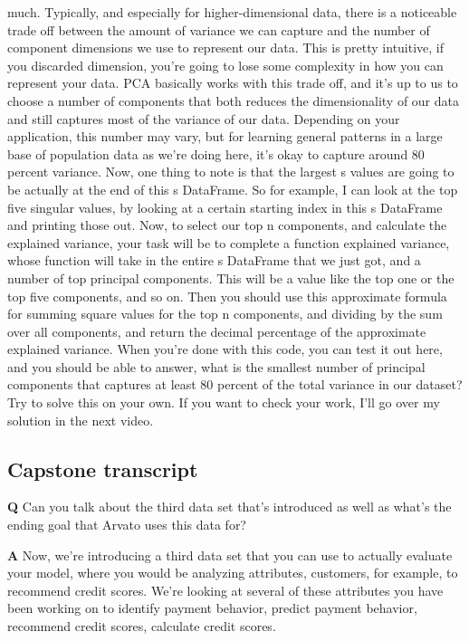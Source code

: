 much. Typically, and especially for higher-dimensional data, there is a
noticeable trade off between the amount of variance we can capture and
the number of component dimensions we use to represent our data. This is
pretty intuitive, if you discarded dimension, you're going to lose some
complexity in how you can represent your data. PCA basically works with
this trade off, and it's up to us to choose a number of components that
both reduces the dimensionality of our data and still captures most of
the variance of our data. Depending on your application, this number may
vary, but for learning general patterns in a large base of population
data as we're doing here, it's okay to capture around 80 percent
variance. Now, one thing to note is that the largest s values are going
to be actually at the end of this s DataFrame. So for example, I can
look at the top five singular values, by looking at a certain starting
index in this s DataFrame and printing those out. Now, to select our top
n components, and calculate the explained variance, your task will be to
complete a function explained variance, whose function will take in the
entire s DataFrame that we just got, and a number of top principal
components. This will be a value like the top one or the top five
components, and so on. Then you should use this approximate formula for
summing square values for the top n components, and dividing by the sum
over all components, and return the decimal percentage of the
approximate explained variance. When you're done with this code, you can
test it out here, and you should be able to answer, what is the smallest
number of principal components that captures at least 80 percent of the
total variance in our dataset? Try to solve this on your own. If you
want to check your work, I'll go over my solution in the next video.

\hypertarget{capstone-transcript}{%
\subsection{Capstone transcript}\label{capstone-transcript}}

\textbf{Q} Can you talk about the third data set that's introduced as
well as what's the ending goal that Arvato uses this data for?

\textbf{A} Now, we're introducing a third data set that you can use to
actually evaluate your model, where you would be analyzing attributes,
customers, for example, to recommend credit scores. We're looking at
several of these attributes you have been working on to identify payment
behavior, predict payment behavior, recommend credit scores, calculate
credit scores.

